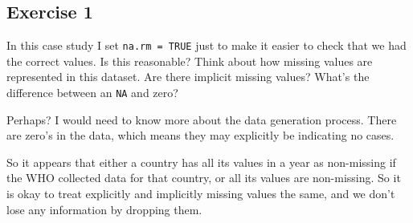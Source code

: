 \documentclass[]{book}
\newenvironment{Shaded}{\begin{snugshade}}{\end{snugshade}}
\newcommand{\CommentTok}[1]{\textcolor[rgb]{0.56,0.35,0.01}{\textit{#1}}}
\newcommand{\DataTypeTok}[1]{\textcolor[rgb]{0.13,0.29,0.53}{#1}}
\newcommand{\DecValTok}[1]{\textcolor[rgb]{0.00,0.00,0.81}{#1}}
\newcommand{\KeywordTok}[1]{\textcolor[rgb]{0.13,0.29,0.53}{\textbf{#1}}}
\newcommand{\NormalTok}[1]{#1}
\newcommand{\OperatorTok}[1]{\textcolor[rgb]{0.81,0.36,0.00}{\textbf{#1}}}
\newcommand{\StringTok}[1]{\textcolor[rgb]{0.31,0.60,0.02}{#1}}
\theoremstyle{definition}
\theoremstyle{definition}
\theoremstyle{definition}
\theoremstyle{remark}
\begin{document}
\hypertarget{exercise-1-20}{%
\subsection{Exercise 1}\label{exercise-1-20}}

In this case study I set \texttt{na.rm\ =\ TRUE} just to make it easier
to check that we had the correct values. Is this reasonable? Think about
how missing values are represented in this dataset. Are there implicit
missing values? What's the difference between an \texttt{NA} and zero?

Perhaps? I would need to know more about the data generation process.
There are zero's in the data, which means they may explicitly be
indicating no cases.

\begin{Shaded}
\end{Shaded}

So it appears that either a country has all its values in a year as
non-missing if the WHO collected data for that country, or all its
values are non-missing. So it is okay to treat explicitly and implicitly
missing values the same, and we don't lose any information by dropping
them.

\begin{Shaded}
\end{Shaded}
\end{document}
